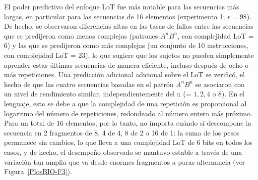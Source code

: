 El poder predictivo del enfoque LoT fue más notable para las secuencias más largas, en particular para las secuencias de 16 elementos (experimento 1; $r = 98$). De hecho, se observaron diferencias altas en las tasas de fallos entre las secuencias que se predijeron como menos complejas (patrones $A^nB^n$, con complejidad LoT = 6) y las que se predijeron como más complejas (un conjunto de 10 instrucciones, con complejidad LoT = 23), lo que sugiere que los sujetos no pueden simplemente aprender estas últimas secuencias de manera eficiente, incluso después de ocho o más repeticiones. Una predicción adicional adicional sobre el LoT se verificó, el hecho de que las cuatro secuencias basadas en el patrón $A^nB^n$ se asociaron con un nivel de rendimiento similar, independientemente del n (= $1, 2, 4$ o $8$). En el lenguaje, esto se debe a que la complejidad de una repetición es proporcional al logaritmo del número de repeticiones, redondeado al número entero más próximo. Para un total de 16 elementos, por lo tanto, no importa cuándo si descompone la secuencia en 2 fragmentos de 8, 4 de 4, 8 de 2 o 16 de 1: la suma de los pesos permanece sin cambios, lo que lleva a una complejidad LoT de 6 bits en todos los casos, y de hecho, el desempeño observado se mantuvo estable a través de una variación tan amplia que va desde enormes fragmentos a puras alternancia (ver Figura~\ref{PlosBIO-F3}).


